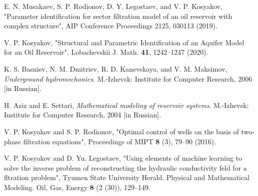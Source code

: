 \documentclass{article}
\begin{document}
%
%
\begin{thebibliography}{20}
 E. N. Musakaev, S. P. Rodionov, D. Y. Legostaev, and V. P. Kosyakov,
"Parameter identification for sector filtration model of an oil reservoir with complex structure",
AIP Conference Proceedings 2125, 030113 (2019).

 V. P. Kosyakov, "Structural and Parametric Identification
of an Aquifer Model for an Oil Reservoir". Lobachevskii J. Math.
{\bf 41}, 1242--1247 (2020).

 K. S. Basniev, N. M. Dmitriev, R. D. Kanevskaya, and V. M. Maksimov,
\textit{Underground hydromechanics}. M.-Izhevsk: Institute for
Computer Research, 2006 [in Russian].

 H. Aziz and E. Settari, \textit{Mathematical modeling of reservoir systems}.
M.-Izhevsk: Institute for Computer Research, 2004 [in Russian].

 V. P. Kosyakov and S. P. Rodionov, "Optimal control of wells on the basis
of two-phase filtration equations", Proceedings of MIPT {\bf 8} (3),
79--90 (2016).

 V. P. Kosyakov and  D. Yu. Legostaev, "Using elements of machine learning to
solve the inverse problem of reconstructing the hydraulic 
conductivity feld for a fltration problem", Tyumen State University
Herald. Physical and Mathematical Modeling. Oil, Gas, Energy {\bf 8}
(2 (30)), 129--149.

\end{thebibliography}
\end{document}
